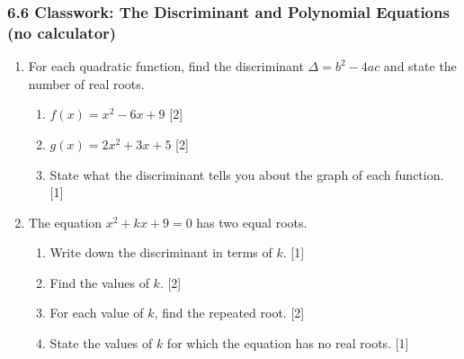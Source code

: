\documentclass[12pt, twoside]{article}
\begin{document}
\subsubsection*{6.6 Classwork: The Discriminant and Polynomial Equations (no calculator)}

\begin{enumerate}[itemsep=0.15cm]

\item[1.] [Maximum mark: 5]

For each quadratic function, find the discriminant $\Delta = b^2 - 4ac$
and state the number of real roots.

\begin{enumerate}[itemsep=0.15cm]
  \item $f(x) = x^2 - 6x + 9$ \hfill [2]
  \item $g(x) = 2x^2 + 3x + 5$ \hfill [2]
  \item State what the discriminant tells you about the graph
  of each function. \hfill [1]
\end{enumerate}


\vspace{0.3cm}

\item[2.] [Maximum mark: 6]

The equation $x^2 + kx + 9 = 0$ has two equal roots.

\begin{enumerate}[itemsep=0.15cm]
  \item Write down the discriminant in terms of $k$. \hfill [1]
  \item Find the values of $k$. \hfill [2]
  \item For each value of $k$, find the repeated root. \hfill [2]
  \item State the values of $k$ for which the equation has no
  real roots. \hfill [1]
\end{enumerate}



\end{enumerate}
\end{document}
